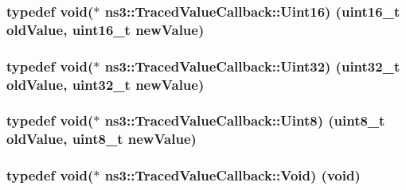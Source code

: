 \subsubsection[{\texorpdfstring{Uint16}{Uint16}}]{\setlength{\rightskip}{0pt plus 5cm}typedef void($\ast$  ns3\+::\+Traced\+Value\+Callback\+::\+Uint16) (uint16\+\_\+t old\+Value, uint16\+\_\+t new\+Value)}\hypertarget{namespacens3_1_1TracedValueCallback_a0966dfa38c6729766c3e68f8a3996b41}{}\label{namespacens3_1_1TracedValueCallback_a0966dfa38c6729766c3e68f8a3996b41}
\subsubsection[{\texorpdfstring{Uint32}{Uint32}}]{\setlength{\rightskip}{0pt plus 5cm}typedef void($\ast$  ns3\+::\+Traced\+Value\+Callback\+::\+Uint32) (uint32\+\_\+t old\+Value, uint32\+\_\+t new\+Value)}\hypertarget{namespacens3_1_1TracedValueCallback_a7a8acb7551dcca7b77b7488bbe00b042}{}\label{namespacens3_1_1TracedValueCallback_a7a8acb7551dcca7b77b7488bbe00b042}
\subsubsection[{\texorpdfstring{Uint8}{Uint8}}]{\setlength{\rightskip}{0pt plus 5cm}typedef void($\ast$  ns3\+::\+Traced\+Value\+Callback\+::\+Uint8) (uint8\+\_\+t old\+Value, uint8\+\_\+t new\+Value)}\hypertarget{namespacens3_1_1TracedValueCallback_afe3b1b129457374bd27c782da6d3583f}{}\label{namespacens3_1_1TracedValueCallback_afe3b1b129457374bd27c782da6d3583f}
\subsubsection[{\texorpdfstring{Void}{Void}}]{\setlength{\rightskip}{0pt plus 5cm}typedef void($\ast$  ns3\+::\+Traced\+Value\+Callback\+::\+Void) (void)}\hypertarget{namespacens3_1_1TracedValueCallback_aa63613617d4ddb8f016ed0edb0300270}{}\label{namespacens3_1_1TracedValueCallback_aa63613617d4ddb8f016ed0edb0300270}
